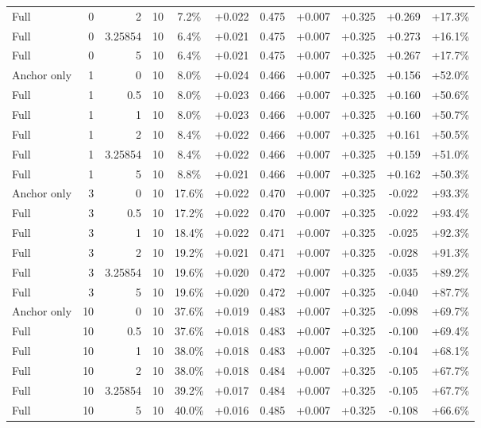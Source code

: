 \begin{table}[htbp]
\begin{tabular}{lrrrccccccc}
Full & 0 & 2 & 10 & 7.2\% & +0.022 & 0.475 & +0.007 & +0.325 & +0.269 & +17.3\% \\
Full & 0 & 3.25854 & 10 & 6.4\% & +0.021 & 0.475 & +0.007 & +0.325 & +0.273 & +16.1\% \\
Full & 0 & 5 & 10 & 6.4\% & +0.021 & 0.475 & +0.007 & +0.325 & +0.267 & +17.7\% \\
Anchor only & 1 & 0 & 10 & 8.0\% & +0.024 & 0.466 & +0.007 & +0.325 & +0.156 & +52.0\% \\
Full & 1 & 0.5 & 10 & 8.0\% & +0.023 & 0.466 & +0.007 & +0.325 & +0.160 & +50.6\% \\
Full & 1 & 1 & 10 & 8.0\% & +0.023 & 0.466 & +0.007 & +0.325 & +0.160 & +50.7\% \\
Full & 1 & 2 & 10 & 8.4\% & +0.022 & 0.466 & +0.007 & +0.325 & +0.161 & +50.5\% \\
Full & 1 & 3.25854 & 10 & 8.4\% & +0.022 & 0.466 & +0.007 & +0.325 & +0.159 & +51.0\% \\
Full & 1 & 5 & 10 & 8.8\% & +0.021 & 0.466 & +0.007 & +0.325 & +0.162 & +50.3\% \\
Anchor only & 3 & 0 & 10 & 17.6\% & +0.022 & 0.470 & +0.007 & +0.325 & -0.022 & +93.3\% \\
Full & 3 & 0.5 & 10 & 17.2\% & +0.022 & 0.470 & +0.007 & +0.325 & -0.022 & +93.4\% \\
Full & 3 & 1 & 10 & 18.4\% & +0.022 & 0.471 & +0.007 & +0.325 & -0.025 & +92.3\% \\
Full & 3 & 2 & 10 & 19.2\% & +0.021 & 0.471 & +0.007 & +0.325 & -0.028 & +91.3\% \\
Full & 3 & 3.25854 & 10 & 19.6\% & +0.020 & 0.472 & +0.007 & +0.325 & -0.035 & +89.2\% \\
Full & 3 & 5 & 10 & 19.6\% & +0.020 & 0.472 & +0.007 & +0.325 & -0.040 & +87.7\% \\
Anchor only & 10 & 0 & 10 & 37.6\% & +0.019 & 0.483 & +0.007 & +0.325 & -0.098 & +69.7\% \\
Full & 10 & 0.5 & 10 & 37.6\% & +0.018 & 0.483 & +0.007 & +0.325 & -0.100 & +69.4\% \\
Full & 10 & 1 & 10 & 38.0\% & +0.018 & 0.483 & +0.007 & +0.325 & -0.104 & +68.1\% \\
Full & 10 & 2 & 10 & 38.0\% & +0.018 & 0.484 & +0.007 & +0.325 & -0.105 & +67.7\% \\
Full & 10 & 3.25854 & 10 & 39.2\% & +0.017 & 0.484 & +0.007 & +0.325 & -0.105 & +67.7\% \\
Full & 10 & 5 & 10 & 40.0\% & +0.016 & 0.485 & +0.007 & +0.325 & -0.108 & +66.6\% \\

\end{tabular}
\end{table}

